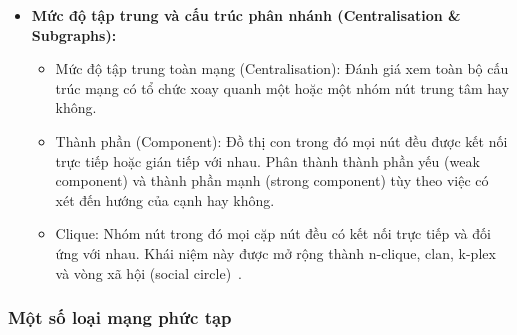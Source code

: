 \documentclass[14pt,a4paper]{extarticle}
\begin{document}
\begin{itemize}
    \item \textbf{Mức độ tập trung và cấu trúc phân nhánh (Centralisation \& Subgraphs):}
    \begin{itemize}
        \item Mức độ tập trung toàn mạng (Centralisation): Đánh giá xem toàn bộ cấu trúc mạng có tổ chức xoay quanh một hoặc một nhóm nút trung tâm hay không.
        \item Thành phần (Component): Đồ thị con trong đó mọi nút đều được kết nối trực tiếp hoặc gián tiếp với nhau. Phân thành thành phần yếu (weak component) và thành phần mạnh (strong component) tùy theo việc có xét đến hướng của cạnh hay không.
        \item Clique: Nhóm nút trong đó mọi cặp nút đều có kết nối trực tiếp và đối ứng với nhau. Khái niệm này được mở rộng thành n-clique, clan, k-plex và vòng xã hội (social circle)~\cite{Scott2012}.
    \end{itemize}
\end{itemize}

\subsubsection{Một số loại mạng phức tạp}
\end{document}
